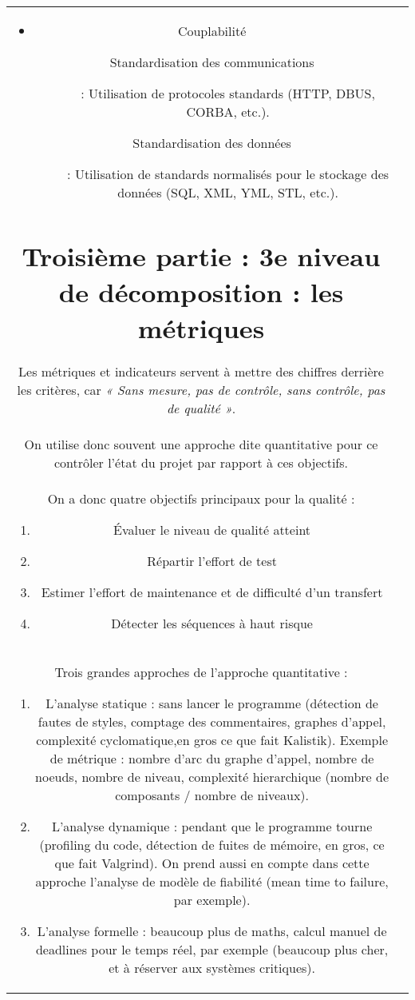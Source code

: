 \begin{tabular}{|c|c|}
\begin{itemize}
\begin{itemize}
	\item Couplabilité
		\begin{description}	
		\item[Standardisation des communications] : Utilisation de 	 protocoles standards (HTTP, DBUS, CORBA, etc.).
		\item[Standardisation des données] : Utilisation de standards normalisés pour le stockage des données (SQL, XML, YML, STL, etc.).
		\end{description}

	\end{itemize}

\end{itemize}


\section{Troisième partie : 3e niveau de décomposition : les métriques}

Les métriques et indicateurs servent à mettre des chiffres derrière les critères, car \textit{« Sans mesure, pas de contrôle, sans contrôle, pas de qualité »}.\\
On utilise donc souvent une approche dite quantitative pour ce contrôler l’état du projet par rapport à ces objectifs.\\ 
On a donc quatre objectifs principaux pour la qualité :
\begin{enumerate}
\item Évaluer le niveau de qualité atteint
\item Répartir l’effort de test
\item Estimer l’effort de maintenance et de difficulté d’un transfert
\item Détecter les séquences à haut risque
\end{enumerate}

\hfill\\

Trois grandes approches de l’approche quantitative :
\begin{enumerate}
\item L’analyse statique : sans lancer le programme (détection de fautes de styles, comptage des commentaires, graphes d’appel, complexité cyclomatique,en gros ce que fait Kalistik). Exemple de métrique : nombre d’arc du graphe d’appel, nombre de noeuds, nombre de niveau, complexité hierarchique (nombre de composants / nombre de niveaux).
\item L’analyse dynamique : pendant que le programme tourne (profiling du code, détection de fuites de mémoire, en gros, ce que fait Valgrind). On prend aussi en compte dans cette approche l’analyse de modèle de fiabilité (mean time to failure, par exemple).
\item L’analyse formelle : beaucoup plus de maths, calcul manuel de deadlines pour le temps réel, par exemple (beaucoup plus cher, et à réserver aux systèmes critiques).
\end{enumerate}


\end{tabular}
